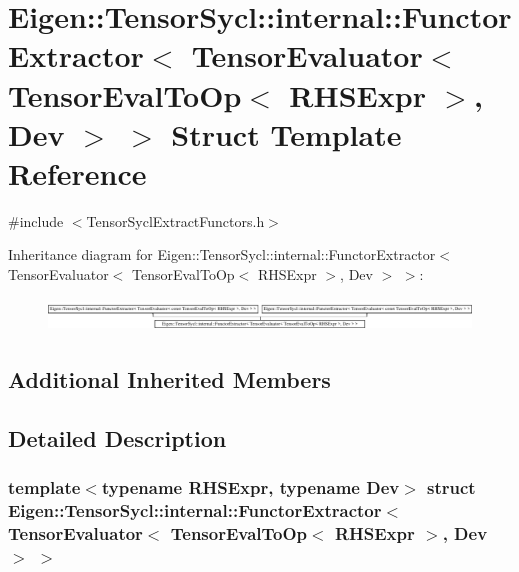 \hypertarget{struct_eigen_1_1_tensor_sycl_1_1internal_1_1_functor_extractor_3_01_tensor_evaluator_3_01_tensor7896c82115c99c0cee70b3042a1b8761}{}\section{Eigen\+:\+:Tensor\+Sycl\+:\+:internal\+:\+:Functor\+Extractor$<$ Tensor\+Evaluator$<$ Tensor\+Eval\+To\+Op$<$ R\+H\+S\+Expr $>$, Dev $>$ $>$ Struct Template Reference}
\label{struct_eigen_1_1_tensor_sycl_1_1internal_1_1_functor_extractor_3_01_tensor_evaluator_3_01_tensor7896c82115c99c0cee70b3042a1b8761}


{\ttfamily \#include $<$Tensor\+Sycl\+Extract\+Functors.\+h$>$}

Inheritance diagram for Eigen\+:\+:Tensor\+Sycl\+:\+:internal\+:\+:Functor\+Extractor$<$ Tensor\+Evaluator$<$ Tensor\+Eval\+To\+Op$<$ R\+H\+S\+Expr $>$, Dev $>$ $>$\+:\begin{figure}[H]
\begin{center}
\leavevmode
\includegraphics[height=0.862866cm]{struct_eigen_1_1_tensor_sycl_1_1internal_1_1_functor_extractor_3_01_tensor_evaluator_3_01_tensor7896c82115c99c0cee70b3042a1b8761}
\end{center}
\end{figure}
\subsection*{Additional Inherited Members}


\subsection{Detailed Description}
\subsubsection*{template$<$typename R\+H\+S\+Expr, typename Dev$>$\newline
struct Eigen\+::\+Tensor\+Sycl\+::internal\+::\+Functor\+Extractor$<$ Tensor\+Evaluator$<$ Tensor\+Eval\+To\+Op$<$ R\+H\+S\+Expr $>$, Dev $>$ $>$}


